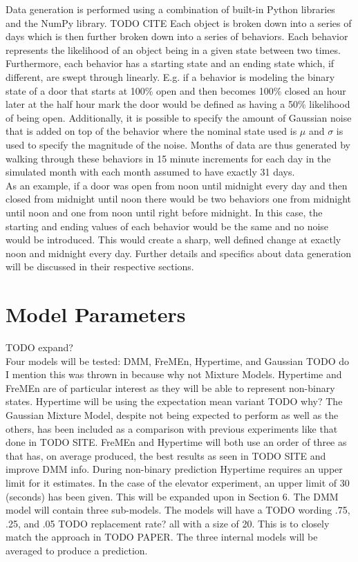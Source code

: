   Data generation is performed using a combination of built-in Python libraries and
  the NumPy library. TODO CITE Each object is broken down into a series of days which is
  then further broken down into a series of behaviors. Each behavior
  represents the likelihood of an object being in a given state between two
  times. Furthermore, each behavior has a starting state and an ending state
  which, if different, are swept through linearly. E.g. if a behavior is
  modeling the binary state of a door that starts at 100\% open and then becomes
  100\% closed an hour later at the half hour mark the door would be defined as having
  a 50\% likelihood of being open. Additionally, it is possible
  to specify the amount of Gaussian noise that is added on top of the
  behavior where the nominal state used is $\mu$ and $\sigma$ is used to
  specify the magnitude of the noise. Months of data are thus generated by
  walking through these behaviors in 15 minute increments for each day in the
  simulated month with each month assumed to have exactly 31 days. \\

  As an example, if a door was open from noon until midnight every day and then closed from
  midnight until noon there would be two behaviors one from midnight until
  noon and one from noon until right before midnight. In this case, the
  starting and ending values of each behavior would be the same and no noise
  would be introduced. This would create a sharp, well defined change at
  exactly noon and midnight every day. Further details and specifics about data
  generation will be discussed in their respective sections. \\

  \section{ Model Parameters }
  TODO expand? \\

  Four models will be tested: DMM, FreMEn, Hypertime, and Gaussian TODO do I mention this was thrown in because why not
  Mixture Models. Hypertime and FreMEn are of particular interest as they will
  be able to represent non-binary states. Hypertime will be using the
  expectation mean variant TODO why? The Gaussian Mixture Model, despite not
  being expected to perform as well as the others, has been included as a
  comparison with previous experiments like that done in TODO SITE. FreMEn and
  Hypertime will both use an order of three as that has, on average produced,
  the best results as seen in TODO SITE and improve DMM info. During
  non-binary prediction Hypertime requires an upper limit for it estimates. In
  the case of the elevator experiment, an upper limit of 30 (seconds) has been
  given. This will be expanded upon in Section 6. The DMM model will
  contain three sub-models. The models will have a TODO wording .75, .25, and
  .05 TODO replacement rate? all with a size of 20. This is to closely match
  the approach in TODO PAPER. The three internal models will be averaged
  to produce a prediction.\\

